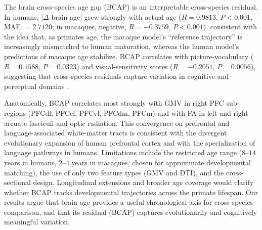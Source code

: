 \documentclass[11pt]{article}
\begin{document}
The brain cross-species age gap (BCAP) is an interpretable cross-species residual. In humans, $|\Delta$ brain age$|$ grew strongly with actual age ($R = 0.9813$, $P < 0.001$, MAE $= 2.7120$; in macaques, negative, $R = -0.3759$, $P < 0.001$), consistent with the idea that, as primates age, the macaque model's ``reference trajectory'' is increasingly mismatched to human maturation, whereas the human model's predictions of macaque age stabilize. BCAP correlates with picture-vocabulary ($R = 0.1588$, $P = 0.0323$) and visual-sensitivity scores ($R = -0.2051$, $P = 0.0056$), suggesting that cross-species residuals capture variation in cognitive and perceptual domains \cite{smith2015positive,liem2017predicting}.

Anatomically, BCAP correlates most strongly with GMV in right PFC sub-regions (PFCdl, PFCcl, PFCvl, PFCdm, PFCm) and with FA in left and right arcuate fasciculi and optic radiation. This convergence on prefrontal and language-associated white-matter tracts is consistent with the divergent evolutionary expansion of human prefrontal cortex \cite{passingham2002specialization,neubertcerebellum2015,schoenemann2006prefrontal,rakic2009evolution,hill2010similar} and with the specialization of language pathways in humans. Limitations include the restricted age range ($8$--$14$ years in humans, $2$--$4$ years in macaques, chosen for approximate developmental matching), the use of only two feature types (GMV and DTI), and the cross-sectional design. Longitudinal extensions and broader age coverage would clarify whether BCAP tracks developmental trajectories across the primate lifespan. Our results argue that brain age provides a useful chronological axis for cross-species comparison, and that its residual (BCAP) captures evolutionarily and cognitively meaningful variation.



\end{document}
